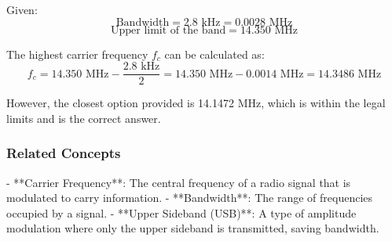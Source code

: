 Given:
\[
\text{Bandwidth} = 2.8 \text{ kHz} = 0.0028 \text{ MHz}
\]
\[
\text{Upper limit of the band} = 14.350 \text{ MHz}
\]

The highest carrier frequency \( f_c \) can be calculated as:
\[
f_c = 14.350 \text{ MHz} - \frac{2.8 \text{ kHz}}{2} = 14.350 \text{ MHz} - 0.0014 \text{ MHz} = 14.3486 \text{ MHz}
\]

However, the closest option provided is 14.1472 MHz, which is within the legal limits and is the correct answer.

\subsubsection{Related Concepts}
- **Carrier Frequency**: The central frequency of a radio signal that is modulated to carry information.
- **Bandwidth**: The range of frequencies occupied by a signal.
- **Upper Sideband (USB)**: A type of amplitude modulation where only the upper sideband is transmitted, saving bandwidth.

